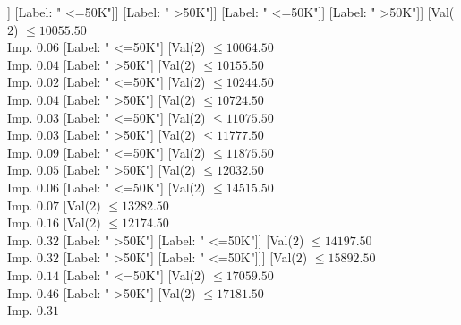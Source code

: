 \documentclass[margin=10pt]{standalone}
\begin{document}
\begin{forest}
																											[Label: " >50K"]]
																										[Label: " <=50K"]]
																									[Label: " >50K"]]
																								[Label: " <=50K"]]
																							[Label: " >50K"]]
																						[Val($2$) $ \leq 10055.50$ \\ Imp. $0.06$
																							[Label: " <=50K"]
																							[Val($2$) $ \leq 10064.50$ \\ Imp. $0.04$
																								[Label: " >50K"]
																								[Val($2$) $ \leq 10155.50$ \\ Imp. $0.02$
																									[Label: " <=50K"]
																									[Val($2$) $ \leq 10244.50$ \\ Imp. $0.04$
																										[Label: " >50K"]
																										[Val($2$) $ \leq 10724.50$ \\ Imp. $0.03$
																											[Label: " <=50K"]
																											[Val($2$) $ \leq 11075.50$ \\ Imp. $0.03$
																												[Label: " >50K"]
																												[Val($2$) $ \leq 11777.50$ \\ Imp. $0.09$
																													[Label: " <=50K"]
																													[Val($2$) $ \leq 11875.50$ \\ Imp. $0.05$
																														[Label: " >50K"]
																														[Val($2$) $ \leq 12032.50$ \\ Imp. $0.06$
																															[Label: " <=50K"]
																															[Val($2$) $ \leq 14515.50$ \\ Imp. $0.07$
																																[Val($2$) $ \leq 13282.50$ \\ Imp. $0.16$
																																	[Val($2$) $ \leq 12174.50$ \\ Imp. $0.32$
																																		[Label: " >50K"]
																																		[Label: " <=50K"]]
																																	[Val($2$) $ \leq 14197.50$ \\ Imp. $0.32$
																																		[Label: " >50K"]
																																		[Label: " <=50K"]]]
																																[Val($2$) $ \leq 15892.50$ \\ Imp. $0.14$
																																	[Label: " <=50K"]
																																	[Val($2$) $ \leq 17059.50$ \\ Imp. $0.46$
																																		[Label: " >50K"]
																																		[Val($2$) $ \leq 17181.50$ \\ Imp. $0.31$

\end{forest}
\end{document}
